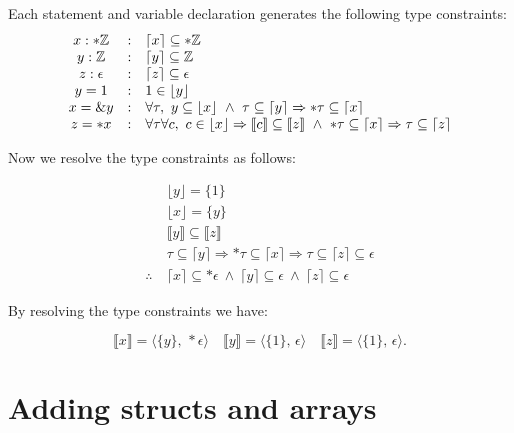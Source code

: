 \documentclass[peerreview, 10pt]{IEEEtran}
\newcommand{\Z}{\ensuremath{\mathbb{Z}}}
\newcommand{\cons}[1]{\ensuremath{\llbracket#1\rrbracket}}
\newcommand{\consp}[2]{\ensuremath{\langle#1,\,#2\rangle}}
\newcommand{\floor}[1]{\ensuremath{\lfloor#1\rfloor}}
\newcommand{\ceil}[1]{\ensuremath{\lceil#1\rceil}}
\newcommand{\enum}{\ensuremath{\epsilon}}
\newcommand{\ifrule}[2]{\ensuremath{#1&:&#2}}
\begin{document}
Each statement and variable declaration generates the following type constraints:
\[
\begin{array}{@{}ccl@{}}
  \ifrule{x:*\Z}{\ceil{x}\subseteq *\Z}\\
  \ifrule{y:\Z}{\ceil{y}\subseteq \Z}\\
  \ifrule{z:\enum}{\ceil{z}\subseteq \enum}\\
  \ifrule{y=1}{1\in\floor{y}}\\
  \ifrule{x=\&y}{\forall\tau,\ y\subseteq \floor{x}\ \land\ \tau\subseteq\ceil{y}\Rightarrow*\tau\subseteq\ceil{x}}\\
  \ifrule{z=*x}{\forall\tau\forall c,\ c\in \floor{x}\Rightarrow\cons{c}\subseteq\cons{z}\ \land\ *\tau\subseteq\ceil{x}\Rightarrow\tau\subseteq\ceil{z}}
\end{array}
\]

Now we resolve the type constraints as follows:

\[
\begin{aligned}
  &\floor{y}=\{1\}\\
  &\floor{x}=\{y\}\\
  &\cons{y}\subseteq\cons{z}\\
  &\tau\subseteq\ceil{y}\Rightarrow *\tau\subseteq\ceil{x}\Rightarrow\tau\subseteq\ceil{z}\subseteq\enum\\
  \therefore\ &\ceil{x}\subseteq*\enum\ \land\ \ceil{y}\subseteq\enum\ \land\ \ceil{z}\subseteq\enum
\end{aligned}
\]

By resolving the type constraints we have:

\[
\cons{x}=\consp{\{y\}}{*\enum}\quad\cons{y}=\consp{\{1\}}{\enum}\quad\cons{z}=\consp{\{1\}}{\enum}.
\]

\section{Adding structs and arrays}
\end{document}

